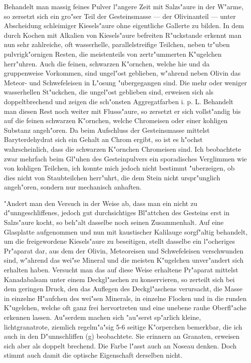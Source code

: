 \documentclass[a4paper, 11pt, oneside]{article}
\begin{document}
Behandelt man massig feines Pulver l"angere Zeit mit Salzs"aure in der W"arme, so zersetzt sich ein gro"ser Teil der Gesteinsmasse --- der Olivinanteil --- unter Abscheidung schleimiger Kiesels"aure ohne eigentliche Gallerte zu bilden. In dem durch Kochen mit Alkalien von Kiesels"aure befreiten R"uckstande erkennt man nun sehr zahlreiche, oft wasserhelle, parallelstreifige Teilchen, neben tr"uben pulvrigk"ornigen Resten, die meistenteils von zertr"ummerten K"ugelchen herr"uhren. Auch die feinen, schwarzen K"ornchen, welche hie und da gruppenweise Vorkommen, sind ungel"ost geblieben, w"ahrend neben Olivin das Meteor- und Schwefeleisen in L"osung "ubergegangen sind. Die mehr oder weniger wasserhellen St"uckchen, die ungel"ost geblieben sind, erweisen sich als doppeltbrechend und zeigen die sch"onsten Aggregatfarben i. p. L. Behandelt man diesen Rest noch weiter mit Flusss"aure, so zersetzt er sich vollst"andig bis auf die feinen schwarzen K"ornchen, welche Chromeisen oder einer kohligen Substanz angeh"oren. Da beim Aufschluss der Gesteinsmasse mittelst Baryterdehydrat sich ein Gehalt an Chrom ergibt, so ist es h"ochst wahrscheinlich, dass die schwarzen K"ornchen Chromeisen sind. Ich beobachtete zwar mehrfach beim Gl"uhen des Gesteinpulvers ein sporadisches Verglimmen wie von kohligen Teilchen, ich konnte mich jedoch nicht bestimmt "uberzeigen, ob dies nicht von Staubteilchen herr"uhrt, die dem Stein nicht urspr"unglich angeh"oren, sondern nur mechanisch anhaften.

"Andert man den Versuch in der Weise ab, dass man ein nicht zu d"unngeschliffenes, jedoch gut durchsichtiges Bl"attchen des Gesteins erst in Salzs"aure kocht, so beh"alt dasselbe noch seinen Zusammenhalt. Auf eine Glasplatte aufgenommen und nun mit kaustischer Kalilauge sorgf"altig behandelt, um die freigewordene Kiesels"aure zu beseitigen, stellt dasselbe ein l"ocheriges Pr"aparat dar, aus dem der Olivin, Meteoreisen und Schwefeleisen verschwunden sind, w"ahrend das wei"se Mineral und die meisten K"ugelchen unver"andert sich erhalten haben. Versucht man das auf diese Weise erhaltene Pr"aparat mittelst Kanadabalsam unter einem Deckgl"aschen zu konservieren, so zerteilt sich bei dem geringen Druck, den das Auflegen des Deckgl"aschens verursacht, die Masse in einzelne H"aufchen des wei"sen Minerals, in einzelne Flocken und in die runden K"ugelchen, welche oft ganz frei hervortreten und eine unebene rauhe Oberfl"ache erkennen lassen. Au"serdem machen sich "au"serst sp"arlich kleine, lichtgranatrote, ziemlich regelm"a"sig 5-6 seitige K"orperchen bemerkbar, die ich auch in den D"unnschliffen (g) beobachtete. Sie erinnern an Granaten, erweisen sich aber als doppelt brechend. Die Farbe l"asst auch an Noseau denken. Doch stimmt auch damit die optische Eigenschaft derselben nicht.
\end{document}
